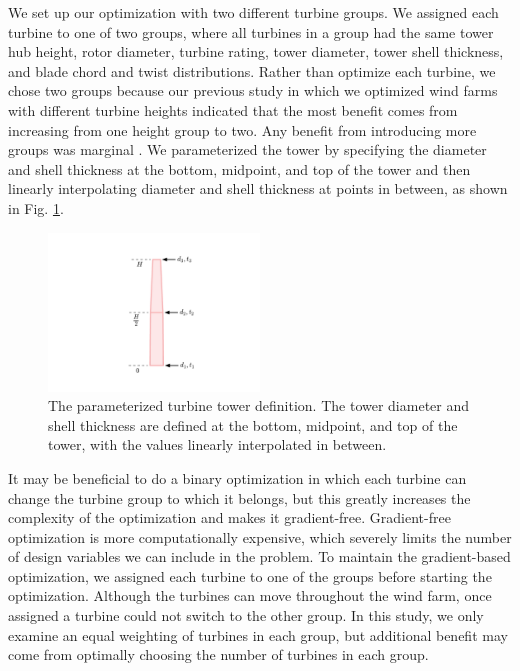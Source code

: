 We set up our optimization with two different turbine groups. We assigned each turbine to one of two groups, where all turbines in a group had the same tower hub height, rotor diameter, turbine rating, tower diameter, tower shell thickness, and blade chord and twist distributions.
Rather than optimize each turbine, we chose two groups because our previous study in which we optimized wind farms with different turbine heights indicated that the most benefit comes from increasing from one height group to two. Any benefit from introducing more groups was marginal \citep{stanley2018}. We parameterized the tower by specifying the diameter and shell thickness at the bottom, midpoint, and top of the tower and then linearly interpolating diameter and shell thickness at points in between, as shown in Fig. \ref{tower_def}.

\begin{figure}[htbp]
  \centering
  \includegraphics[width=0.5\textwidth]{Figures/tower_param.pdf}
  \caption{\label{tower_def} The parameterized turbine tower definition. The tower diameter and shell thickness are defined at the bottom, midpoint, and top of the tower, with the values linearly interpolated in between.}
\end{figure}
        
        It may be beneficial to do a binary optimization in which each turbine can change the turbine group to which it belongs, but this greatly increases the complexity of the optimization and makes it gradient-free. Gradient-free optimization is more computationally expensive, which severely limits the number of design variables we can include in the problem. To maintain the gradient-based optimization, we assigned each turbine to one of the groups before starting the optimization. Although the turbines can move throughout the wind farm, once assigned a turbine could not switch to the other group. In this study, we only examine an equal weighting of turbines in each group, but additional benefit may come from optimally choosing the number of turbines in each group.%
        
